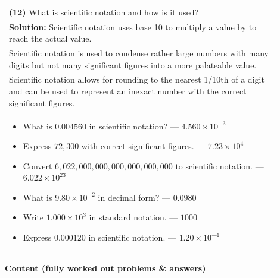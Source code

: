 \documentclass{article}
\begin{document}
\begin{tabular}{|p{0.9\linewidth}|}
\hline
\textbf{(12)} What is scientific notation and how is it used? \\
\textbf{Solution:} Scientific notation uses base 10 to multiply a value by to reach the actual value. \\
Scientific notation is used to condense rather large numbers with many digits but not many significant figures into a more palateable value. \\
Scientific notation allows for rounding to the nearest 1/10th of a digit and can be used to represent an inexact number with the correct significant figures. \\
\begin{itemize}
  \item What is $0.004560$ in scientific notation? --- $4.560 \times 10^{-3}$
  \item Express $72{,}300$ with correct significant figures. --- $7.23 \times 10^{4}$
  \item Convert $6{,}022{,}000{,}000{,}000{,}000{,}000{,}000$ to scientific notation. --- $6.022 \times 10^{23}$
  \item What is $9.80 \times 10^{-2}$ in decimal form? --- $0.0980$
  \item Write $1.000 \times 10^{3}$ in standard notation. --- $1000$
  \item Express $0.000120$ in scientific notation. --- $1.20 \times 10^{-4}$
\end{itemize}
\hline
\end{tabular}
\newpage




\noindent
{\large \textbf{Content (fully worked out problems \& answers)}} \\[0.2em]
\end{document}

